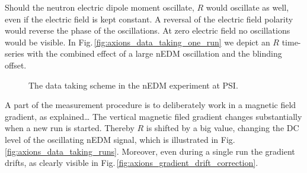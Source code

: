 Should the neutron electric dipole moment oscillate, $R$ would oscillate as well, even if the electric field is kept constant. A reversal of the electric field polarity would reverse the phase of the oscillations. At zero electric field no oscillations would be visible. In Fig.\,\ref{fig:axions_data_taking_one_run} we depict an $R$ time-series with the combined effect of a large nEDM oscillation and the blinding offset.

\begin{figure}[bth]
  \myfloatalign
  \quad
  \caption{The data taking scheme in the nEDM experiment at PSI.}
\end{figure}

A part of the measurement procedure is to deliberately work in a magnetic field gradient, as explained\ldots {} The vertical magnetic filed gradient changes substantially when a new run is started.  Thereby $R$ is shifted by a big value, changing the DC level of the oscillating nEDM signal, which is illustrated in Fig.\,\ref{fig:axions_data_taking_runs}. Moreover, even during a single run the gradient drifts, as clearly visible in Fig.\,\ref{fig:axions_gradient_drift_correction}. 

